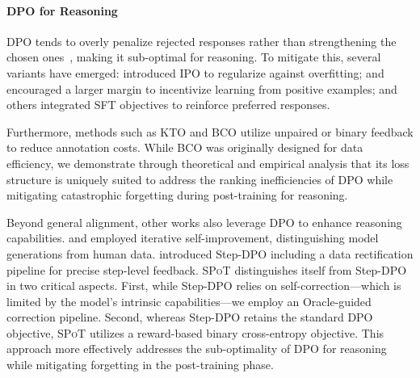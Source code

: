 \documentclass{article}
\newcommand{\methodName}{{\textsc{SPoT}}\xspace}
\theoremstyle{plain}
\theoremstyle{definition}
\theoremstyle{remark}
\begin{document}
\paragraph{DPO for Reasoning}
DPO tends to overly penalize rejected responses rather than strengthening the chosen ones~\citep{renlearning,azar2024general,pal2024smaug}, making it sub-optimal for reasoning. To mitigate this, several variants have emerged: \citet{azar2024general} introduced IPO to regularize against overfitting; \citet{pal2024smaug} and \citet{meng2024simpo} encouraged a larger margin to incentivize learning from positive examples; and others \citep{hong2024orpo,wang2024enhancing} integrated SFT objectives to reinforce preferred responses.

Furthermore, methods such as KTO \citep{ethayarajh2024kto} and BCO \citep{jung2025binary} utilize unpaired or binary feedback to reduce annotation costs. While BCO was originally designed for data efficiency, we demonstrate through theoretical and empirical analysis that its loss structure is uniquely suited to address the ranking inefficiencies of DPO while mitigating catastrophic forgetting during post-training for reasoning.

Beyond general alignment, other works also leverage DPO to enhance reasoning capabilities. \citet{chen2024self} and \citet{pang2024iterative} employed iterative self-improvement, distinguishing model generations from human data. \citet{lai2024step} introduced Step-DPO including a data rectification pipeline for precise step-level feedback. \methodName distinguishes itself from Step-DPO in two critical aspects. First, while Step-DPO relies on self-correction—which is limited by the model's intrinsic capabilities—we employ an Oracle-guided correction pipeline. Second, whereas Step-DPO retains the standard DPO objective, \methodName utilizes a reward-based binary cross-entropy objective. This approach more effectively addresses the sub-optimality of DPO for reasoning while mitigating forgetting in the post-training phase.
\end{document}
